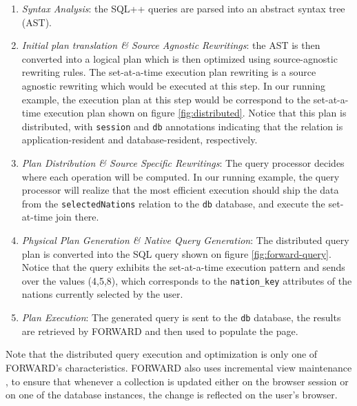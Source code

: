 \begin{enumerate}
\item{\emph{Syntax Analysis}: the SQL++ queries are parsed into an abstract syntax tree (AST).}
\item{\emph{Initial plan translation \& Source Agnostic Rewritings}: the AST is then converted into a logical plan which is then optimized using source-agnostic rewriting rules. The set-at-a-time execution plan rewriting is a source agnostic rewriting which would be executed at this step. In our running example, the execution plan at this step would be correspond to the set-at-a-time execution plan shown on figure \ref{fig:distributed}. Notice that this plan is distributed, with \texttt{session} and \texttt{db} annotations indicating that the relation is application-resident and database-resident, respectively.}
\item{\emph{Plan Distribution \& Source Specific Rewritings}: The query processor decides where each operation will be computed. In our running example, the query processor will realize that the most efficient execution should ship the data from the \texttt{selectedNations} relation to the \texttt{db} database, and execute the set-at-time join there.}
\item{\emph{Physical Plan Generation \& Native Query Generation}: The distributed query plan is converted into the SQL query shown on figure \ref{fig:forward-query}. Notice that the query exhibits the set-at-a-time execution pattern and sends over the values (4,5,8), which corresponds to the \texttt{nation\_key} attributes of the nations currently selected by the user. }
\item{\emph{Plan Execution}: The generated query is sent to the \texttt{db} database, the results are retrieved by FORWARD and then used to populate the page.}
\end{enumerate}

Note that the distributed query execution and optimization is only one of FORWARD's characteristics. FORWARD also uses incremental view maintenance \cite{fu:2011aa}, to ensure that whenever a collection is updated either on the browser session or on one of the database instances, the change is reflected on the user's browser. 